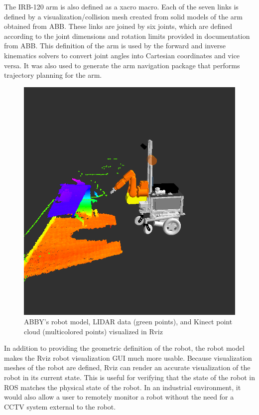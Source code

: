 \documentclass[]{cwru} %
\begin{document}
The IRB-120 arm is also defined as a xacro macro. Each of the seven
links is defined by a visualization/collision mesh created from solid
models of the arm obtained from ABB. These links are joined by six
joints, which are defined according to the joint dimensions and rotation
limits provided in documentation from ABB. This definition of the arm is
used by the forward and inverse kinematics solvers to convert joint
angles into Cartesian coordinates and vice versa. It was also used to
generate the arm navigation package that performs trajectory planning
for the arm.

\begin{figure}[h]
\centering
\includegraphics[width=6.0in]{rviz}
\caption{ABBY’s robot model, LIDAR data (green points), and Kinect point 
cloud (multicolored points) visualized in Rviz}
\label{fig:rviz}
\end{figure}

In addition to providing the geometric definition of the robot, the
robot model makes the Rviz robot visualization GUI much more usable.
Because visualization meshes of the robot are defined, Rviz can render
an accurate visualization of the robot in its current state. This is
useful for verifying that the state of the robot in ROS matches the
physical state of the robot. In an industrial environment, it would also
allow a user to remotely monitor a robot without the need for a CCTV
system external to the robot.
\end{document}
